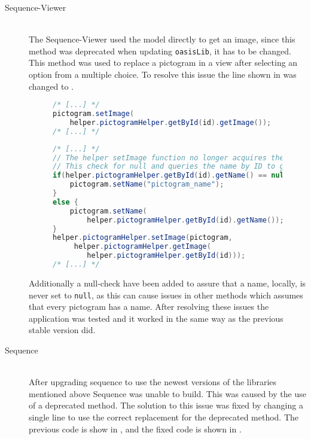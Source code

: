 \begin{description} 
    \item[Sequence-Viewer] \hfill \\ 
    The Sequence-Viewer used the model directly to get an image, since this method was deprecated when updating \texttt{oasisLib}, it has to be changed. 
    This method was used to replace a pictogram in a view after selecting an option from a multiple choice. 
     To resolve this issue the line shown in  was changed to . 
     \begin{figure} 
        \begin{lstlisting}[language=java, caption={Sequence-Viewer with deprecated method call. }, label=lst:dep-sv-prev] 
/* [...] */ 
pictogram.setImage( 
    helper.pictogramHelper.getById(id).getImage()); 
/* [...] */ 
        \end{lstlisting} 
    \end{figure} 
    \begin{figure} 
        \begin{lstlisting}[language=java, caption={Sequence-Viewer replacement code. }, label=lst:dep-sv-upd] 
/* [...] */ 
// The helper setImage function no longer acquires the pictogram name and causes null exception error 
// This check for null and queries the name by ID to get name 
if(helper.pictogramHelper.getById(id).getName() == null) { 
    pictogram.setName("pictogram_name"); 
} 
else { 
    pictogram.setName( 
        helper.pictogramHelper.getById(id).getName()); 
} 
helper.pictogramHelper.setImage(pictogram, 
     helper.pictogramHelper.getImage( 
        helper.pictogramHelper.getById(id))); 
/* [...] */ 
        \end{lstlisting} 
    \end{figure} 
    Additionally a null-check have been added to assure that a name, locally, is never set to \texttt{null}, as this can cause issues in other methods which assumes that every pictogram has a name. 
     After resolving these issues the application was tested and it worked in the same way as the previous stable version did. 
     \item[Sequence] \hfill \\ 
    After upgrading sequence to use the newest versions of the libraries mentioned above Sequence was unable to build. 
     This was caused by the use of a deprecated method. 
     The solution to this issue was fixed by changing a single line to use the correct replacement for the deprecated method. 
    The previous code is show in , and the fixed code is shown in . 

\end{description}
